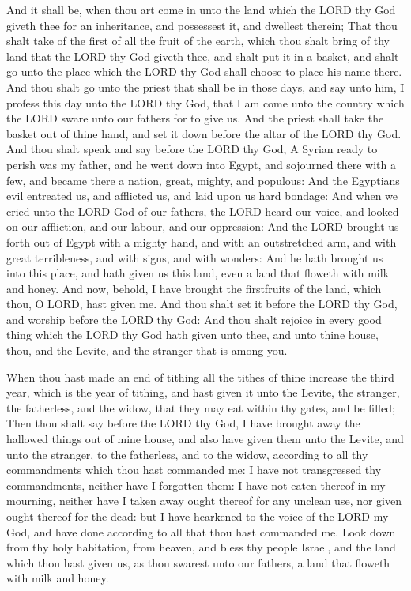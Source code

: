  And it shall be, when thou art come in unto the land
which the LORD thy God giveth thee for an inheritance, and possessest
it, and dwellest therein;  That thou shalt take of the
first of all the fruit of the earth, which thou shalt bring of thy land
that the LORD thy God giveth thee, and shalt put it in a basket, and
shalt go unto the place which the LORD thy God shall choose to place his
name there.  And thou shalt go unto the priest that shall
be in those days, and say unto him, I profess this day unto the LORD thy
God, that I am come unto the country which the LORD sware unto our
fathers for to give us.  And the priest shall take the
basket out of thine hand, and set it down before the altar of the LORD
thy God.  And thou shalt speak and say before the LORD thy
God, A Syrian ready to perish was my father, and he went down into
Egypt, and sojourned there with a few, and became there a nation, great,
mighty, and populous:  And the Egyptians evil entreated
us, and afflicted us, and laid upon us hard bondage:  And
when we cried unto the LORD God of our fathers, the LORD heard our
voice, and looked on our affliction, and our labour, and our oppression:
 And the LORD brought us forth out of Egypt with a mighty
hand, and with an outstretched arm, and with great terribleness, and
with signs, and with wonders:  And he hath brought us into
this place, and hath given us this land, even a land that floweth with
milk and honey.  And now, behold, I have brought the
firstfruits of the land, which thou, O LORD, hast given me. And thou
shalt set it before the LORD thy God, and worship before the LORD thy
God:  And thou shalt rejoice in every good thing which
the LORD thy God hath given unto thee, and unto thine house, thou, and
the Levite, and the stranger that is among you.

 When thou hast made an end of tithing all the tithes of
thine increase the third year, which is the year of tithing, and hast
given it unto the Levite, the stranger, the fatherless, and the widow,
that they may eat within thy gates, and be filled;  Then
thou shalt say before the LORD thy God, I have brought away the hallowed
things out of mine house, and also have given them unto the Levite, and
unto the stranger, to the fatherless, and to the widow, according to all
thy commandments which thou hast commanded me: I have not transgressed
thy commandments, neither have I forgotten them:  I have
not eaten thereof in my mourning, neither have I taken away ought
thereof for any unclean use, nor given ought thereof for the dead: but I
have hearkened to the voice of the LORD my God, and have done according
to all that thou hast commanded me.  Look down from thy
holy habitation, from heaven, and bless thy people Israel, and the land
which thou hast given us, as thou swarest unto our fathers, a land that
floweth with milk and honey.

